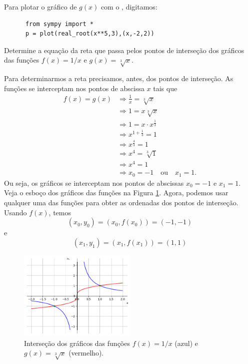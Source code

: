 \begin{resol}
\begin{enumerate}[a)]
    \ifispython
    Para plotar o gráfico de $g(x)$ com o {\sympy}, digitamos:
    \begin{lstlisting}
      from sympy import *
      p = plot(real_root(x**5,3),(x,-2,2))
    \end{lstlisting}
    \fi
  \end{enumerate}
\end{resol}

\begin{exeresol}\label{exeresol:funpot_intersep}
  Determine a equação da reta que passa pelos pontos de interseção dos gráficos das funções $f(x) = 1/x$ e $g(x) = \sqrt[3]{x}$.
\end{exeresol}
\begin{resol}
  Para determinarmos a reta precisamos, antes, dos pontos de interseção. As funções se interceptam nos pontos de abscissa $x$ tais que
  \begin{align}
    f(x) = g(x) &\Rightarrow \frac{1}{x} = \sqrt[3]{x}\\
                &\Rightarrow 1 = x\sqrt[3]{x}\\
                &\Rightarrow 1 = x\cdot x^{\frac{1}{3}}\\
                &\Rightarrow x^{1+\frac{1}{3}} = 1\\
                &\Rightarrow x^{\frac{4}{3}} = 1\\
                &\Rightarrow x^4 = \sqrt[3]{1}\\
                &\Rightarrow x^4 = 1\\
                &\Rightarrow x_0 = -1\quad\text{ou}\quad x_1=1.
  \end{align}
  Ou seja, os gráficos se interceptam nos pontos de abscissas $x_0 = -1$ e $x_1 = 1$. Veja o esboço dos gráficos das funções na Figura \ref{fig:exeresol_funpot_intersep}. Agora, podemos usar qualquer uma das funções para obter as ordenadas dos pontos de interseção. Usando $f(x)$, temos
  \begin{equation}
    (x_0, y_0) = (x_0, f(x_0)) = (-1, -1)
  \end{equation}
  e
  \begin{equation}
     (x_1, y_1) = (x_1, f(x_1)) = (1, 1)
  \end{equation}

  \begin{figure}[H]
    \centering
    \includegraphics[width=0.5\textwidth]{./cap_funcao/dados/fig_exeresol_funpot_intersep/fig_exeresol_funpot_intersep}
    \caption{Interseção dos gráficos das funções $f(x) = 1/x$ (azul) e $g(x) = \sqrt[3]{x}$ (vermelho).}
    \label{fig:exeresol_funpot_intersep}
  \end{figure}


\end{resol}

